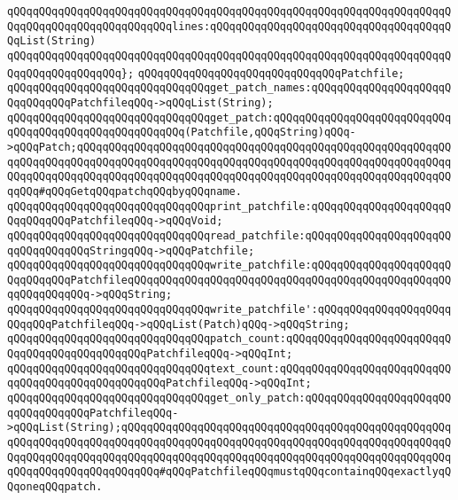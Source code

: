\verb|qQQqqQQqqQQqqQQqqQQqqQQqqQQqqQQqqQQqqQQqqQQqqQQqqQQqqQQqqQQqqQQqqQQqqQQqqQQqqQQqqQQqqQQqqQQqqQQqlines:qQQqqQQqqQQqqQQqqQQqqQQqqQQqqQQqqQQqqQQqList(String)|\newline
\verb|qQQqqQQqqQQqqQQqqQQqqQQqqQQqqQQqqQQqqQQqqQQqqQQqqQQqqQQqqQQqqQQqqQQqqQQqqQQqqQQqqQQqqQQq};|\newline
\newline
\verb|qQQqqQQqqQQqqQQqqQQqqQQqqQQqqQQqPatchfile;|\newline
\newline
\verb|qQQqqQQqqQQqqQQqqQQqqQQqqQQqqQQqget_patch_names:qQQqqQQqqQQqqQQqqQQqqQQqqQQqqQQqPatchfileqQQq->qQQqList(String);|\newline
\newline
\verb|qQQqqQQqqQQqqQQqqQQqqQQqqQQqqQQqget_patch:qQQqqQQqqQQqqQQqqQQqqQQqqQQqqQQqqQQqqQQqqQQqqQQqqQQqqQQq(Patchfile,qQQqString)qQQq->qQQqPatch;qQQqqQQqqQQqqQQqqQQqqQQqqQQqqQQqqQQqqQQqqQQqqQQqqQQqqQQqqQQqqQQqqQQqqQQqqQQqqQQqqQQqqQQqqQQqqQQqqQQqqQQqqQQqqQQqqQQqqQQqqQQqqQQqqQQqqQQqqQQqqQQqqQQqqQQqqQQqqQQqqQQqqQQqqQQqqQQqqQQqqQQqqQQqqQQqqQQqqQQqqQQq#qQQqGetqQQqpatchqQQqbyqQQqname.|\newline
\newline
\verb|qQQqqQQqqQQqqQQqqQQqqQQqqQQqqQQqprint_patchfile:qQQqqQQqqQQqqQQqqQQqqQQqqQQqqQQqPatchfileqQQq->qQQqVoid;|\newline
\newline
\verb|qQQqqQQqqQQqqQQqqQQqqQQqqQQqqQQqread_patchfile:qQQqqQQqqQQqqQQqqQQqqQQqqQQqqQQqqQQqStringqQQq->qQQqPatchfile;|\newline
\newline
\verb|qQQqqQQqqQQqqQQqqQQqqQQqqQQqqQQqwrite_patchfile:qQQqqQQqqQQqqQQqqQQqqQQqqQQqqQQqPatchfileqQQqqQQqqQQqqQQqqQQqqQQqqQQqqQQqqQQqqQQqqQQqqQQqqQQqqQQqqQQqqQQq->qQQqString;|\newline
\verb|qQQqqQQqqQQqqQQqqQQqqQQqqQQqqQQqwrite_patchfile':qQQqqQQqqQQqqQQqqQQqqQQqqQQqPatchfileqQQq->qQQqList(Patch)qQQq->qQQqString;|\newline
\newline
\verb|qQQqqQQqqQQqqQQqqQQqqQQqqQQqqQQqpatch_count:qQQqqQQqqQQqqQQqqQQqqQQqqQQqqQQqqQQqqQQqqQQqqQQqPatchfileqQQq->qQQqInt;|\newline
\verb|qQQqqQQqqQQqqQQqqQQqqQQqqQQqqQQqtext_count:qQQqqQQqqQQqqQQqqQQqqQQqqQQqqQQqqQQqqQQqqQQqqQQqqQQqPatchfileqQQq->qQQqInt;|\newline
\newline
\verb|qQQqqQQqqQQqqQQqqQQqqQQqqQQqqQQqget_only_patch:qQQqqQQqqQQqqQQqqQQqqQQqqQQqqQQqqQQqPatchfileqQQq->qQQqList(String);qQQqqQQqqQQqqQQqqQQqqQQqqQQqqQQqqQQqqQQqqQQqqQQqqQQqqQQqqQQqqQQqqQQqqQQqqQQqqQQqqQQqqQQqqQQqqQQqqQQqqQQqqQQqqQQqqQQqqQQqqQQqqQQqqQQqqQQqqQQqqQQqqQQqqQQqqQQqqQQqqQQqqQQqqQQqqQQqqQQqqQQqqQQqqQQqqQQqqQQqqQQqqQQqqQQqqQQq#qQQqPatchfileqQQqmustqQQqcontainqQQqexactlyqQQqoneqQQqpatch.|\newline
